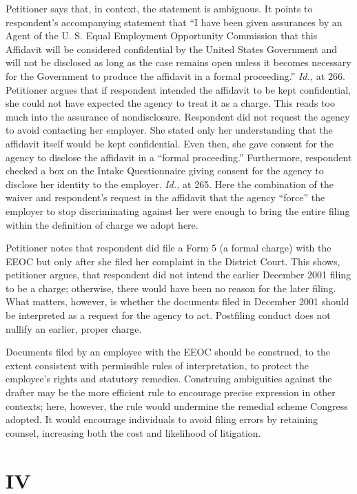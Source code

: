   Petitioner says that, in context, the statement is ambiguous. It
points to respondent's accompanying statement that ``I have been
given assurances by an Agent of the U. S. Equal Employment Opportunity
Commission that this Affidavit will be considered confidential by the
United States Government and will not be disclosed as long as the case
remains open unless it becomes necessary for the Government to produce
the affidavit in a formal proceeding.'' \emph{Id.,} at 266. Petitioner
argues that if respondent intended the affidavit to \newpage  be kept
confidential, she could not have expected the agency to treat it as
a charge. This reads too much into the assurance of nondisclosure.
Respondent did not request the agency to avoid contacting her employer.
She stated only her understanding that the affidavit itself would
be kept confidential. Even then, she gave consent for the agency to
disclose the affidavit in a ``formal proceeding.'' Furthermore,
respondent checked a box on the Intake Questionnaire giving consent
for the agency to disclose her identity to the employer. \emph{Id.,} at
265. Here the combination of the waiver and respondent's request
in the affidavit that the agency ``force'' the employer to stop
discriminating against her were enough to bring the entire filing within
the definition of charge we adopt here.

  Petitioner notes that respondent did file a Form 5 (a formal charge)
with the EEOC but only after she filed her complaint in the District
Court. This shows, petitioner argues, that respondent did not intend the
earlier December 2001 filing to be a charge; otherwise, there would have
been no reason for the later filing. What matters, however, is whether
the documents filed in December 2001 should be interpreted as a request
for the agency to act. Postfiling conduct does not nullify an earlier,
proper charge.

  Documents filed by an employee with the EEOC should be construed,
to the extent consistent with permissible rules of interpretation, to
protect the employee's rights and statutory remedies. Construing
ambiguities against the drafter may be the more efficient rule to
encourage precise expression in other contexts; here, however, the rule
would undermine the remedial scheme Congress adopted. It would encourage
individuals to avoid filing errors by retaining counsel, increasing both
the cost and likelihood of litigation.

\section{IV}

